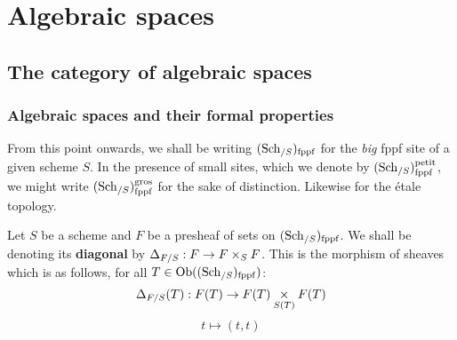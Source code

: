 \section{Algebraic spaces}
    \subsection{The category of algebraic spaces}
        \subsubsection{Algebraic spaces and their formal properties}
            \begin{convention} \label{conv: big_sites_of_schemes}
                From this point onwards, we shall be writing $(\mathrm{Sch}_{/S})_{\mathrm{fppf}}$ for the \textit{big} fppf site of a given scheme $S$. In the presence of small sites, which we denote by $(\mathrm{Sch}_{/S})_{\mathrm{fppf}}^{\mathrm{petit}}$, we might write $(\mathrm{Sch}_{/S})_{\mathrm{fppf}}^{\mathrm{gros}}$ for the sake of distinction. Likewise for the \'etale topology.
            \end{convention}
            \begin{convention}[Diagonals] \label{conv: algebraic_spaces_diagonals}
                Let $S$ be a scheme and $F$ be a presheaf of sets on $(\mathrm{Sch}_{/S})_{\mathrm{fppf}}$. We shall be denoting its \textbf{diagonal} by $\Delta_{F/S}: F \to F \x_S F$. This is the morphism of sheaves which is as follows, for all $T \in \mathrm{Ob}((\mathrm{Sch}_{/S})_{\mathrm{fppf}})$:
                    $$\Delta_{F/S}(T): F(T) \to F(T) \x_{S(T)} F(T)$$
                    $$t \mapsto (t, t)$$
            \end{convention}
            
